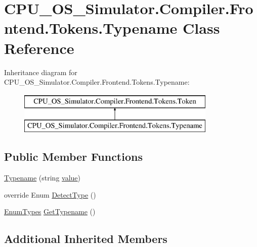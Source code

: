 \hypertarget{class_c_p_u___o_s___simulator_1_1_compiler_1_1_frontend_1_1_tokens_1_1_typename}{}\section{C\+P\+U\+\_\+\+O\+S\+\_\+\+Simulator.\+Compiler.\+Frontend.\+Tokens.\+Typename Class Reference}
\label{class_c_p_u___o_s___simulator_1_1_compiler_1_1_frontend_1_1_tokens_1_1_typename}
Inheritance diagram for C\+P\+U\+\_\+\+O\+S\+\_\+\+Simulator.\+Compiler.\+Frontend.\+Tokens.\+Typename\+:\begin{figure}[H]
\begin{center}
\leavevmode
\includegraphics[height=2.000000cm]{class_c_p_u___o_s___simulator_1_1_compiler_1_1_frontend_1_1_tokens_1_1_typename}
\end{center}
\end{figure}
\subsection*{Public Member Functions}
\begin{DoxyCompactItemize}
\item 
\hyperlink{class_c_p_u___o_s___simulator_1_1_compiler_1_1_frontend_1_1_tokens_1_1_typename_a88c1ae87fd0ed6772577303ae2776c6b}{Typename} (string \hyperlink{class_c_p_u___o_s___simulator_1_1_compiler_1_1_frontend_1_1_tokens_1_1_token_a5c05e12850ca18be8cbfdf7e2e263324}{value})
\item 
override Enum \hyperlink{class_c_p_u___o_s___simulator_1_1_compiler_1_1_frontend_1_1_tokens_1_1_typename_ac03153af0baa70a7943edc9a36c6f555}{Detect\+Type} ()
\item 
\hyperlink{namespace_c_p_u___o_s___simulator_1_1_compiler_1_1_frontend_1_1_tokens_a7c0cc43763cc9d01c7d5af34d70b96ea}{Enum\+Types} \hyperlink{class_c_p_u___o_s___simulator_1_1_compiler_1_1_frontend_1_1_tokens_1_1_typename_aefe888a2588f1e2f903851366e1ab7b4}{Get\+Typename} ()
\end{DoxyCompactItemize}
\subsection*{Additional Inherited Members}


